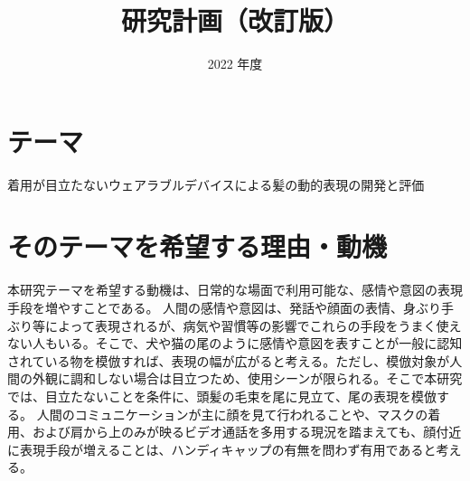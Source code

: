 \documentclass[a4paper]{jsarticle}
\begin{document}
\masterthesis %


\title{研究計画（改訂版）}
\date{2022 年度}
\maketitle


\setcounter{page}{1} %



\newpage

\setcounter{page}{1} %


\section{テーマ}
着用が目立たないウェアラブルデバイスによる髪の動的表現の開発と評価

\section{そのテーマを希望する理由・動機}
本研究テーマを希望する動機は、日常的な場面で利用可能な、感情や意図の表現手段を増やすことである。
人間の感情や意図は、発話や顔面の表情、身ぶり手ぶり等によって表現されるが、病気や習慣等の影響でこれらの手段をうまく使えない人もいる。そこで、犬や猫の尾のように感情や意図を表すことが一般に認知されている物を模倣すれば、表現の幅が広がると考える。ただし、模倣対象が人間の外観に調和しない場合は目立つため、使用シーンが限られる。そこで本研究では、目立たないことを条件に、頭髪の毛束を尾に見立て、尾の表現を模倣する。
人間のコミュニケーションが主に顔を見て行われることや、マスクの着用、および肩から上のみが映るビデオ通話を多用する現況を踏まえても、顔付近に表現手段が増えることは、ハンディキャップの有無を問わず有用であると考える。
\end{document}
